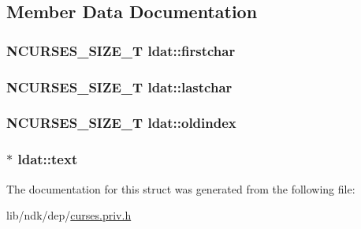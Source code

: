 \subsection{Member Data Documentation}
\hypertarget{structldat_a979c04fa59dceccb042001e9bb30f6f9}{
\subsubsection[{firstchar}]{\setlength{\rightskip}{0pt plus 5cm}N\-C\-U\-R\-S\-E\-S\-\_\-\-S\-I\-Z\-E\-\_\-\-T ldat\-::firstchar}}\label{structldat_a979c04fa59dceccb042001e9bb30f6f9}
\hypertarget{structldat_a96581e4fc676d49e5bec0328586fda26}{
\subsubsection[{lastchar}]{\setlength{\rightskip}{0pt plus 5cm}N\-C\-U\-R\-S\-E\-S\-\_\-\-S\-I\-Z\-E\-\_\-\-T ldat\-::lastchar}}\label{structldat_a96581e4fc676d49e5bec0328586fda26}
\hypertarget{structldat_a1e11ff63417ab82a3074860c79db74bb}{
\subsubsection[{oldindex}]{\setlength{\rightskip}{0pt plus 5cm}N\-C\-U\-R\-S\-E\-S\-\_\-\-S\-I\-Z\-E\-\_\-\-T ldat\-::oldindex}}\label{structldat_a1e11ff63417ab82a3074860c79db74bb}
\hypertarget{structldat_a1fa80aebdc51335b1108c7e115abcb0b}{
\subsubsection[{text}]{$\ast$ ldat\-::text}}\label{structldat_a1fa80aebdc51335b1108c7e115abcb0b}


The documentation for this struct was generated from the following file\-:\begin{DoxyCompactItemize}
\item 
lib/ndk/dep/\hyperlink{curses_8priv_8h}{curses.\-priv.\-h}\end{DoxyCompactItemize}
